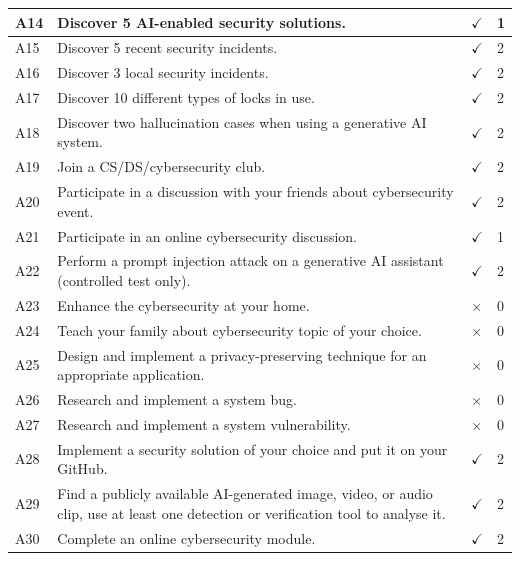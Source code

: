 \documentclass[titlepage]{article}
\begin{document}
\begin{tabular}{ |p{4em}|p{30em}|C{6em}|C{5em}| }
            \hline
            A14 & Discover 5 AI-enabled security solutions. & $\checkmark$ & 1 \\
            \hline
            A15 & Discover 5 recent security incidents. & $\checkmark$ & 2 \\
            \hline
            A16 & Discover 3 local security incidents. & $\checkmark$ & 2 \\
            \hline
            A17 & Discover 10 different types of locks in use. & $\checkmark$ & 2 \\
            \hline
            A18 & Discover two hallucination cases when using a generative AI system. & $\checkmark$ & 2 \\
            \hline
            A19 & Join a CS/DS/cybersecurity club. & $\checkmark$ & 2 \\
            \hline
            A20 & Participate in a discussion with your friends about cybersecurity event. & $\checkmark$ & 2 \\
            \hline
            A21 & Participate in an online cybersecurity discussion. & $\checkmark$ & 1 \\
            \hline
            A22 & Perform a prompt injection attack on a generative AI assistant (controlled test only). & $\checkmark$ & 2 \\
            \hline
            A23 & Enhance the cybersecurity at your home. & $\times$ & 0 \\
            \hline
            A24 & Teach your family about cybersecurity topic of your choice. & $\times$ & 0 \\
            \hline
            A25 & Design and implement a privacy-preserving technique for an appropriate application. & $\times$ & 0 \\
            \hline
            A26 & Research and implement a system bug. & $\times$ & 0 \\
            \hline
            A27 & Research and implement a system vulnerability. & $\times$ & 0 \\
            \hline
            A28 & Implement a security solution of your choice and put it on your GitHub. & $\checkmark$ & 2 \\
            \hline
            A29 & Find a publicly available AI-generated image, video, or audio clip, use at least one detection or verification tool to analyse it. & $\checkmark$ & 2 \\
            \hline
            A30 & Complete an online cybersecurity module. & $\checkmark$ & 2 \\
            \hline
        \end{tabular}
\end{document}
